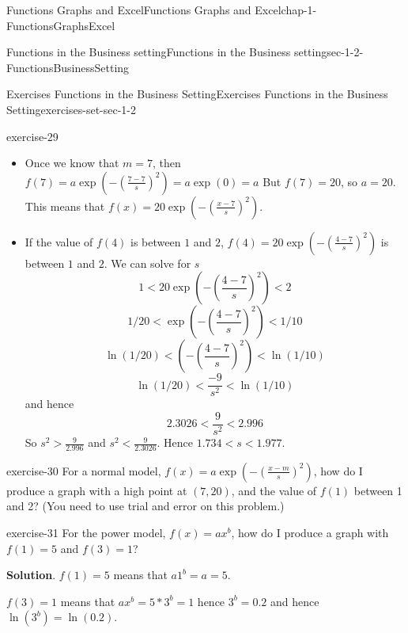\documentclass[oneside,10pt,]{book}
\numberwithin{equation}{section}
\newcommand{\lt}{<}
\newcommand{\gt}{>}
\begin{document}
\begin{chapterptx}{Functions Graphs and Excel}{}{Functions Graphs and Excel}{}{}{chap-1-FunctionsGraphsExcel}
\begin{sectionptx}{Functions in the Business setting}{}{Functions in the Business setting}{}{}{sec-1-2-FunctionsBusinessSetting}
\begin{exercises-subsection-numberless}{Exercises  Functions in the Business Setting}{}{Exercises  Functions in the Business Setting}{}{}{exercises-set-sec-1-2}
\begin{divisionexercise}{9}{}{}{exercise-29}
\begin{itemize}[label=\textbullet]
The high point of the graph occurs when \(\frac{x-m}{s}=0\). This happens at \(x = 7\), so this means that \(m = 7\) as well.%
\item{}\hypertarget{p-196}{}%
Once we know that \(m = 7\), then \(f(7)=a \exp\left(-\left(\frac{7-7}{s}\right)^2 \right)=a \exp(0)=a\) But \(f(7)=20\), so \(a = 20\).  This means that \(f(x)=20 \exp\left(-\left(\frac{x-7}{s}\right)^2\right)\).%
\item{}\hypertarget{p-197}{}%
If the value of \(f(4)\) is between \(1\) and \(2\), \(f(4)=20 \exp\left(-\left(\frac{4-7}{s}\right)^2\right)\) is between \(1\) and \(2\). We can solve for \(s\)%
\begin{equation*}
1\lt 20 \exp\left(-\left(\frac{4-7}{s}\right)^2\right)\lt 2
\end{equation*}
%
\begin{equation*}
1/20\lt \exp\left(-\left(\frac{4-7}{s}\right)^2\right)\lt 1/10
\end{equation*}
%
\begin{equation*}
\ln (1/20)\lt \left(-\left(\frac{4-7}{s}\right)^2\right)\lt \ln (1/10)
\end{equation*}
%
\begin{equation*}
\ln (1/20)\lt \frac{-9}{s^2}\lt \ln (1/10)
\end{equation*}
and hence%
\begin{equation*}
2.3026\lt \frac{9}{s^2} \lt 2.996
\end{equation*}
So  \(s^2\gt \frac{9}{2.996}\) and  \(s^2\lt\frac{9}{2.3026} \). Hence \(1.734\lt s\lt 1.977\).%
\end{itemize}
\end{divisionexercise}%
\begin{divisionexercise}{10}{}{}{exercise-30}%
\hypertarget{p-198}{}%
For a normal model, \(f(x)=a \exp\left(-\left(\frac{x-m}{s}\right)^2\right)\), how do I produce a graph with a high point at \((7, 20)\), and the value of \(f(1)\) between 1 and 2?  (You need to use trial and error on this problem.)%
\end{divisionexercise}%
\begin{divisionexercise}{11}{}{}{exercise-31}%
\hypertarget{p-199}{}%
For the power model, \(f(x)=a x^b\), how do I produce a graph with \(f(1)=5\) and \(f(3)=1\)?%
\par\smallskip%
\noindent\textbf{Solution}.\hypertarget{solution-16}{}\quad%
\hypertarget{p-200}{}%
\(f(1)=5\) means that \(a 1^b=a=5\).%
\par
\hypertarget{p-201}{}%
\(f(3)=1\) means that \(a x^b=5*3^b=1\) hence \(3^b=0.2\) and hence \(\ln(3^b )=\ln(0.2)\).%

\end{divisionexercise}
\end{exercises-subsection-numberless}
\end{sectionptx}
\end{chapterptx}
\end{document}
